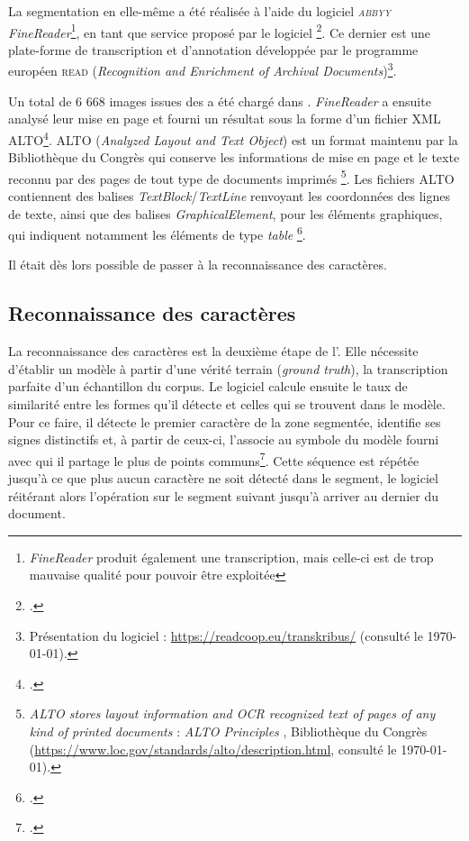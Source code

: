 La segmentation en elle-même a été réalisée à l'aide du logiciel \textit{\textsc{abbyy} FineReader}\footnote{\textit{FineReader} produit également une transcription, mais celle-ci est de trop mauvaise qualité pour pouvoir être exploitée}, en tant que service proposé par le logiciel \transkribus{}\footcite{chague2}. Ce dernier est une plate-forme de transcription et d’annotation développée par le programme européen \textsc{read} (\textit{Recognition and Enrichment of Archival Documents})\footnote{Présentation du logiciel : \url{https://readcoop.eu/transkribus/} (consulté le \today).}.

Un total de 6 668 images issues des \odm{} a été chargé dans \transkribus{}. \textit{FineReader} a ensuite analysé leur mise en page et fourni un résultat sous la forme d'un fichier XML ALTO\footcite{alto}. ALTO (\textit{Analyzed Layout and Text Object}) est un format maintenu par la Bibliothèque du Congrès qui \og conserve les informations de mise en page et le texte reconnu par \ocr{} des pages de tout type de documents imprimés \fg\footnote{\og \textit{ALTO stores layout information and OCR recognized text of pages of any kind of printed documents} \fg{} : \og \textit{ALTO Principles} \fg, Bibliothèque du Congrès (\url{https://www.loc.gov/standards/alto/description.html}, consulté le \today).}. Les fichiers ALTO contiennent \og des balises \textit{TextBlock}/\textit{TextLine} renvoyant les coordonnées des lignes de texte, ainsi que des balises \textit{GraphicalElement}, pour les éléments graphiques, qui indiquent notamment les éléments de type \textit{table} \fg\footcite{chague2}.

Il était dès lors possible de passer à la reconnaissance des caractères.

\subsection{Reconnaissance des caractères}

La reconnaissance des caractères est la deuxième étape de l'\ocr. Elle nécessite d'établir un modèle à partir d'une \og vérité terrain \fg{} (\textit{ground truth}), \cad{} la transcription parfaite d'un échantillon du corpus. Le logiciel calcule ensuite le taux de similarité entre les formes qu'il détecte et celles qui se trouvent dans le modèle. Pour ce faire, il détecte le premier caractère de la zone segmentée, identifie ses signes distinctifs et, à partir de ceux-ci, l'associe au symbole du modèle fourni avec qui il partage le plus de points communs\footcite[p.~3]{casey}. Cette séquence est répétée jusqu'à ce que plus aucun caractère ne soit détecté dans le segment, le logiciel réitérant alors l'opération sur le segment suivant jusqu'à arriver au dernier du document.

